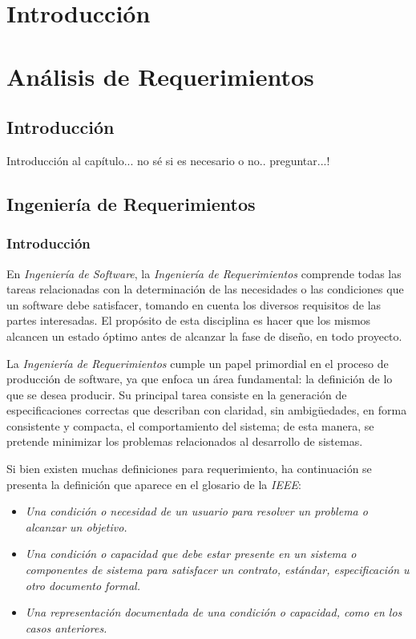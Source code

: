 \documentclass[11pt,oneside]{book}
\begin{document}
\clearpage
\newpage

\chapter{Introducción}

\chapter{Análisis de Requerimientos}

\section{Introducción}
Introducción al capítulo... no sé si es necesario o no.. preguntar...!

\section{Ingeniería de Requerimientos}
\subsection{Introducción}
En \textit{Ingeniería de Software}, la \textit{Ingeniería de Requerimientos} comprende todas las tareas relacionadas con la determinación de las necesidades o las condiciones que un software debe satisfacer, tomando en cuenta los diversos requisitos de las partes interesadas. El propósito de esta disciplina es hacer que los mismos alcancen un estado óptimo antes de alcanzar la fase de diseño, en todo proyecto.

La \textit{Ingeniería de Requerimientos} cumple un papel primordial en el proceso de producción de software, ya que enfoca un área fundamental: la definición de lo que se desea producir. Su principal tarea consiste en la generación de especificaciones correctas que describan con claridad, sin ambigüedades, en forma consistente y compacta, el comportamiento del sistema; de esta manera, se pretende minimizar los problemas relacionados al desarrollo de sistemas.

Si bien existen muchas definiciones para requerimiento, ha continuación se presenta la definición que aparece en el glosario de la \textit{IEEE}:

\begin{itemize}
\item \textit{Una condición o necesidad de un usuario para resolver un problema o alcanzar un objetivo.}
\item \textit{Una condición o capacidad que debe estar presente en un sistema o componentes de sistema para satisfacer un contrato, estándar, especificación u otro documento formal.}
\item \textit{Una representación documentada de una condición o capacidad, como en los casos anteriores.}
\end{itemize}
\end{document}
